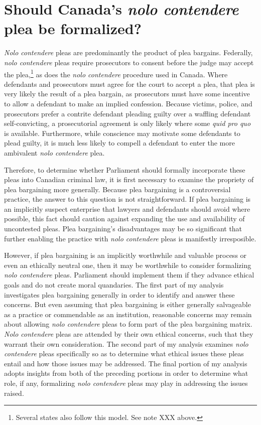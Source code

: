 \chapter{Should Canada's \textit{nolo contendere} plea be formalized?}

\setcounter{footnote}{147}

\textit{Nolo contendere} pleas are predominantly the product of plea bargains. Federally, \textit{nolo contendere} pleas require prosecutors to consent before the judge may accept the plea,\footnote{Several states also follow this model. See note XXX above.} as does the \textit{nolo contendere} procedure used in Canada. Where defendants and prosecutors must agree for the court to accept a plea, that plea is very likely the result of a plea bargain, as prosecutors must have some incentive to allow a defendant to make an implied confession. Because victims, police, and prosecutors prefer a contrite defendant pleading guilty over a waffling defendant self-convicting, a prosecutorial agreement is only likely where some \textit{quid pro quo} is available. Furthermore, while conscience may motivate some defendants to plead guilty, it is much less likely to compell a defendant to enter the more ambivalent \textit{nolo contendere} plea.

Therefore, to determine whether Parliament should formally incorporate these pleas into Canadian criminal law, it is first necessary to examine the propriety of plea bargaining more generally. Because plea bargaining is a controversial practice, the answer to this question is not straightforward. If plea bargaining is an implicitly suspect enterprise that lawyers and defendants should avoid where possible, this fact should caution against expanding the use and availability of uncontested pleas. Plea bargaining's disadvantages may be so significant that further enabling the practice with \textit{nolo contendere} pleas is manifestly irresposible. 

However, if plea bargaining is an implicitly worthwhile and valuable process or even an ethically neutral one, then it may be worthwhile to consider formalizing \textit{nolo contendere} pleas. Parliament should implement them if they advance ethical goals and do not create moral quandaries. The first part of my analysis investigates plea bargaining generally in order to identify and answer these concerns. But even assuming that plea bargaining is either generally salvageable as a practice or commendable as an institution, reasonable concerns may remain about allowing \textit{nolo contendere} pleas to form part of the plea bargaining matrix. \textit{Nolo contendere} pleas are attended by their own ethical concerns, such that they warrant their own consideration. The second part of my analysis examines \textit{nolo contendere} pleas specifically so as to determine what ethical issues these pleas entail and how those issues may be addressed. The final portion of my analysis adopts insights from both of the preceding portions in order to determine what role, if any, formalizing \textit{nolo contendere} pleas may play in addressing the issues raised.